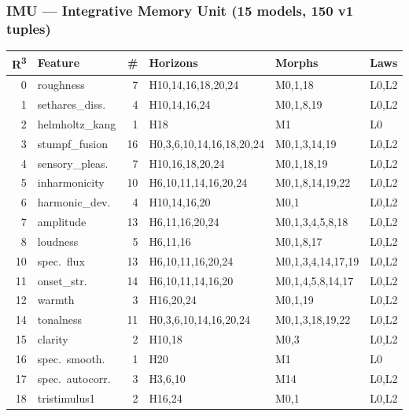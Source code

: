 \subsubsection*{IMU --- Integrative Memory Unit (15 models, 150 v1 tuples)}

{\footnotesize
\begin{longtable}{@{}r l r l l l@{}}
\toprule
\textbf{R\textsuperscript{3}} & \textbf{Feature} & \textbf{\#}
  & \textbf{Horizons} & \textbf{Morphs} & \textbf{Laws} \\
\midrule
\endfirsthead
\midrule
\endhead
\endfoot
\bottomrule
\endlastfoot

\rowcolor{grpA}
0 & roughness & 7 & H10,14,16,18,20,24 & M0,1,18 & L0,L2 \\
\rowcolor{grpA}
1 & sethares\_diss. & 4 & H10,14,16,24 & M0,1,8,19 & L0,L2 \\
\rowcolor{grpA}
2 & helmholtz\_kang & 1 & H18 & M1 & L0 \\
\rowcolor{grpA}
3 & stumpf\_fusion & 16 & H0,3,6,10,14,16,18,20,24 & M0,1,3,14,19 & L0,L2 \\
\rowcolor{grpA}
4 & sensory\_pleas. & 7 & H10,16,18,20,24 & M0,1,18,19 & L0,L2 \\
\rowcolor{grpA}
5 & inharmonicity & 10 & H6,10,11,14,16,20,24 & M0,1,8,14,19,22 & L0,L2 \\
\rowcolor{grpA}
6 & harmonic\_dev. & 4 & H10,14,16,20 & M0,1 & L0,L2 \\
\rowcolor{grpB}
7 & amplitude & 13 & H6,11,16,20,24 & M0,1,3,4,5,8,18 & L0,L2 \\
\rowcolor{grpB}
8 & loudness & 5 & H6,11,16 & M0,1,8,17 & L0,L2 \\
\rowcolor{grpB}
10 & spec.~flux & 13 & H6,10,11,16,20,24 & M0,1,3,4,14,17,19 & L0,L2 \\
\rowcolor{grpB}
11 & onset\_str. & 14 & H6,10,11,14,16,20 & M0,1,4,5,8,14,17 & L0,L2 \\
\rowcolor{grpC}
12 & warmth & 3 & H16,20,24 & M0,1,19 & L0,L2 \\
\rowcolor{grpC}
14 & tonalness & 11 & H0,3,6,10,14,16,20,24 & M0,1,3,18,19,22 & L0,L2 \\
\rowcolor{grpC}
15 & clarity & 2 & H10,18 & M0,3 & L0,L2 \\
\rowcolor{grpC}
16 & spec.~smooth. & 1 & H20 & M1 & L0 \\
\rowcolor{grpC}
17 & spec.~autocorr. & 3 & H3,6,10 & M14 & L0,L2 \\
\rowcolor{grpC}
18 & tristimulus1 & 2 & H16,24 & M0,1 & L0,L2 \\

\end{longtable}}
